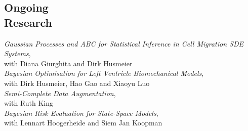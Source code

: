 \documentclass[margin,line]{resume}
\begin{document}
\begin{resume}
\section{\mysidestyle Ongoing \\Research } 
   	\textit{Gaussian Processes and ABC for Statistical Inference in Cell Migration SDE Systems},\\ 
    with Diana Giurghita and Dirk Husmeier\vspace{1mm} \\
   	\textit{Bayesian Optimisation for Left Ventricle Biomechanical Models},\\ 
    with Dirk Husmeier, Hao Gao and Xiaoyu Luo \vspace{1mm} \\   	
   	\textit{Semi-Complete Data Augmentation},\\ 
    with Ruth King \vspace{1mm} \\   
   	\textit{Bayesian Risk Evaluation for State-Space Models},\\ 
    with Lennart Hoogerheide and Siem Jan Koopman\vspace{1mm} \\  
      
\vspace{-4mm}





 \newpage	


\end{resume}
\end{document}
